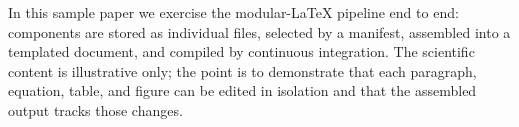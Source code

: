 In this sample paper we exercise the modular-LaTeX pipeline end to
end: components are stored as individual files, selected by a manifest,
assembled into a templated document, and compiled by continuous
integration. The scientific content is illustrative only; the point is
to demonstrate that each paragraph, equation, table, and figure can be
edited in isolation and that the assembled output tracks those changes.

